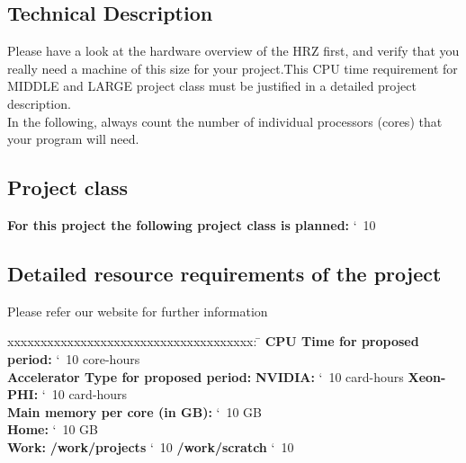 \documentclass[accentcolor=tud9c,nochapname,11pt]{tudexercise}
\makeatletter
\newcommand\saferead[1]{%
  \bgroup
  \let\do\@makeother
  \dospecials\catcode`\ 10
  \egroup 
}
\makeatother
\begin{document}
\begin{Form}
\section{Technical Description}
Please have a look at the hardware overview of the HRZ first, and verify that you really need a machine of this size for your project.This CPU time requirement for MIDDLE and LARGE project class must be justified in a detailed project description. \\

In the following, always count the number of individual processors (cores) that your program will need.\\
\subsection{Project class}
\textbf{For this project the following project class is planned:} \saferead{proj_class.txt} \\
\subsection{Detailed resource requirements of the project}
Please refer our website for further information \\
\begin{tabbing}
xxxxxxxxxxxxxxxxxxxxxxxxxxxxxxxxxxxxx:  \= \kill
\textbf{CPU Time for proposed period:} \saferead{cpu_time.txt} core-hours  \\
\textbf{Accelerator Type for proposed period:}  \> \> \textbf{NVIDIA:} \saferead{acce_nvidia.txt} card-hours  \hspace{40pt} \textbf{Xeon-PHI:} \saferead{acce_xeonphi.txt} card-hours \\
\textbf{Main memory per core (in GB):} \saferead{mem_pc.txt} GB \\
\textbf{Home:} \saferead{home_dir.txt} GB \\
\textbf{Work:} \> \> \textbf{/work/projects} \saferead{work_proj.txt} \hspace{65pt}  \textbf{/work/scratch} \saferead{work_scratch.txt} \\
\end{tabbing}


\end{Form}
\end{document}
